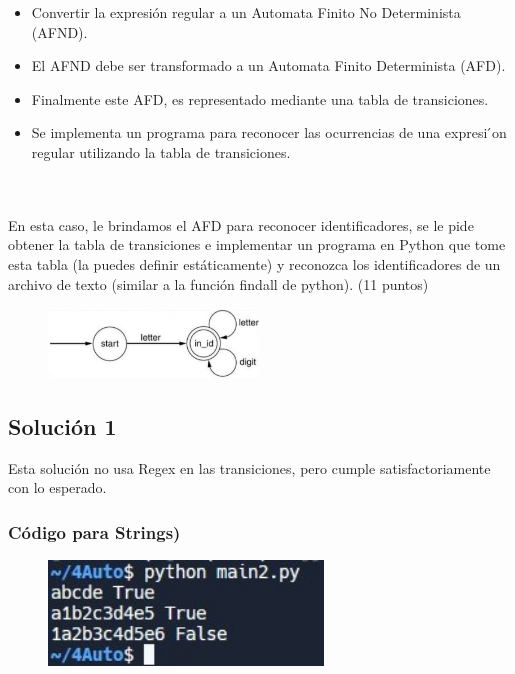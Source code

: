 \documentclass[https://www.overleaf.com/project/63761df255a8a9f4a15c3579
	letterpaper, %
	10pt, %
]{CSUniSchoolLabReport}
\begin{document}
\begin{itemize}
  \item Convertir la expresión regular a un Automata Finito No Determinista (AFND).
  \item El AFND debe ser transformado a un Automata Finito Determinista (AFD).
  \item Finalmente este AFD, es representado mediante una tabla de transiciones.
  \item Se implementa un programa para reconocer las ocurrencias de una expresi ́on regular utilizando la tabla de transiciones.
\end{itemize}
\\\\
En esta caso, le brindamos el AFD para reconocer identificadores, se le pide obtener la tabla de transiciones e implementar un programa en Python que tome esta tabla (la puedes definir estáticamente) y reconozca los identificadores de un archivo de texto (similar a la función findall de python). (11 puntos)

\begin{figure}[H]
	\centering
	\includegraphics[width=0.5\textwidth]{images/two.jpg}
\end{figure}

\subsection*{Solución 1}
Esta solución no usa Regex en las transiciones, pero cumple satisfactoriamente con lo esperado.

\subsubsection*{Código para Strings)}

\begin{figure}[H]
	\centering
	\includegraphics[width=0.65\textwidth]{images/1.jpg}
\end{figure}
\\\\
\end{document}

